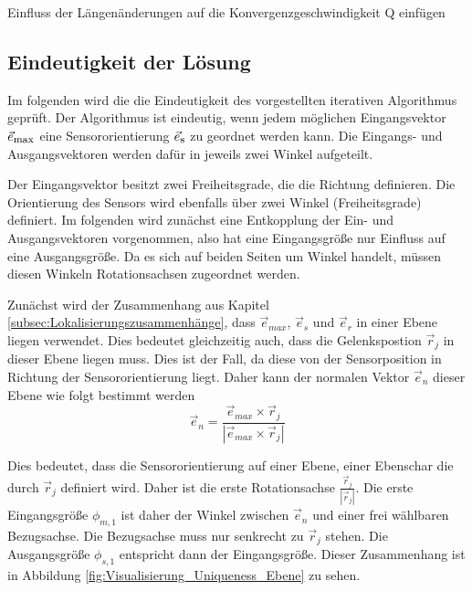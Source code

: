 Einfluss der Längenänderungen auf die Konvergenzgeschwindigkeit
Q einfügen

\subsection{Eindeutigkeit der Lösung}
	Im folgenden wird die die Eindeutigkeit des vorgestellten iterativen Algorithmus geprüft. Der Algorithmus ist eindeutig, wenn jedem möglichen Eingangsvektor $\vec{e}_{\textrm{\footnotesize{max}}}$ eine Sensororientierung $\vec{e}_{\textrm{\footnotesize{s}}}$ zu geordnet werden kann. Die Eingangs- und Ausgangsvektoren werden dafür in jeweils zwei Winkel aufgeteilt. 

    Der Eingangsvektor besitzt zwei Freiheitsgrade, die die Richtung definieren. Die Orientierung des Sensors wird ebenfalls über zwei Winkel (Freiheitsgrade) definiert. Im folgenden wird zunächst eine Entkopplung der Ein- und Ausgangsvektoren vorgenommen, also hat eine Eingangsgröße nur Einfluss auf eine Ausgangsgröße. Da es sich auf beiden Seiten um Winkel handelt, müssen diesen Winkeln Rotationsachsen zugeordnet werden. 

    Zunächst wird der Zusammenhang aus Kapitel \ref{subsec:Lokalisierungszusammenhänge}, dass $\vec{e}_{max}$, $\vec{e}_s$ und $\vec{e}_r$ in einer Ebene liegen verwendet. Dies bedeutet gleichzeitig auch, dass die Gelenkspostion $\vec{r}_j$ in dieser Ebene liegen muss. Dies ist der Fall, da diese von der Sensorposition in Richtung der Sensororientierung liegt. Daher kann der normalen Vektor $\vec{e}_{n}$ dieser Ebene wie folgt bestimmt werden
    \begin{equation}
        \vec{e}_{n} = \frac{\vec{e}_{max}\times \vec{r}_j}{|\vec{e}_{max}\times \vec{r}_j|}
    \end{equation}

    Dies bedeutet, dass die Sensororientierung auf einer Ebene, einer Ebenschar die durch $\vec{r}_j$ definiert wird. Daher ist die erste Rotationsachse $\frac{\vec{r}_j}{|\vec{r}_j|}$. Die erste Eingangsgröße $\phi_{m,1}$ ist daher der Winkel zwischen $\vec{e}_n$ und einer frei wählbaren Bezugsachse. Die Bezugsachse muss nur senkrecht zu $\vec{r}_j$ stehen. Die Ausgangsgröße $\phi_{s,1}$ entspricht dann der Eingangsgröße.  Dieser Zusammenhang ist in Abbildung \ref{fig:Visualisierung_Uniqueness_Ebene} zu sehen.
    
